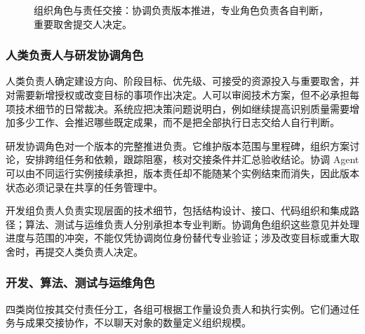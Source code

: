 \documentclass[11pt,a4paper]{article}
\begin{document}
\begin{figure}[H]
\caption{组织角色与责任交接：协调负责版本推进，专业角色负责各自判断，重要取舍提交人决定。}
\label{fig:rd-roles}
\end{figure}

\subsubsection{人类负责人与研发协调角色}

人类负责人确定建设方向、阶段目标、优先级、可接受的资源投入与重要取舍，并对需要新增授权或改变目标的事项作出决定。人可以审阅技术方案，但不必承担每项技术细节的日常裁决。系统应把决策问题说明白，例如继续提高识别质量需要增加多少工作、会推迟哪些既定成果，而不是把全部执行日志交给人自行判断。

研发协调角色对一个版本的完整推进负责。它维护版本范围与里程碑，组织方案讨论，安排跨组任务和依赖，跟踪阻塞，核对交接条件并汇总验收结论。协调 Agent 可以由不同运行实例接续承担，版本责任却不能随某个实例结束而消失，因此版本状态必须记录在共享的任务管理中。

开发组负责人负责实现层面的技术细节，包括结构设计、接口、代码组织和集成路径；算法、测试与运维负责人分别承担本专业判断。协调角色组织这些意见并处理进度与范围的冲突，不能仅凭协调岗位身份替代专业验证；涉及改变目标或重大取舍时，再提交人类负责人决定。

\subsubsection{开发、算法、测试与运维角色}

四类岗位按其交付责任分工，各组可根据工作量设负责人和执行实例。它们通过任务与成果交接协作，不以聊天对象的数量定义组织规模。
\end{document}
